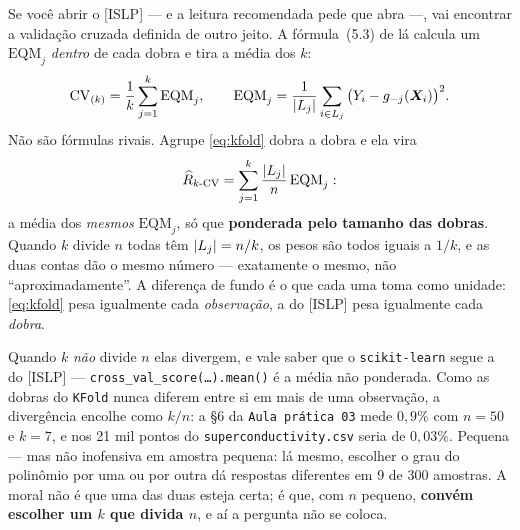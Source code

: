 \documentclass[11pt,a4paper]{article}
\begin{document}
\begin{atencao}
Se você abrir o [ISLP] --- e a leitura recomendada pede que abra ---, vai encontrar
a validação cruzada definida de outro jeito. A fórmula~(5.3) de lá calcula um
$\mathrm{EQM}_j$ \emph{dentro} de cada dobra e tira a média dos $k$:
\[
  \mathrm{CV}_{(k)} = \frac1k\sum_{j=1}^{k}\mathrm{EQM}_j,
  \qquad
  \mathrm{EQM}_j = \frac{1}{\left\lvert L_j \right\rvert}\sum_{i\in L_j}\big(Y_i-g_{-j}(\bm{X}_i)\big)^2 .
\]
Não são fórmulas rivais. Agrupe \eqref{eq:kfold} dobra a dobra e ela vira
\[
  \widehat{R}_{k\text{-CV}} = \sum_{j=1}^{k}\frac{\left\lvert L_j \right\rvert}{n}\,\mathrm{EQM}_j :
\]
a média dos \emph{mesmos} $\mathrm{EQM}_j$, só que \textbf{ponderada pelo tamanho
das dobras}. Quando $k$ divide $n$ todas têm $\left\lvert L_j \right\rvert=n/k$, os pesos são todos
iguais a $1/k$, e as duas contas dão o mesmo número --- exatamente o mesmo, não
``aproximadamente''. A diferença de fundo é o que cada uma toma como unidade:
\eqref{eq:kfold} pesa igualmente cada \emph{observação}, a do [ISLP] pesa
igualmente cada \emph{dobra}.

Quando $k$ \emph{não} divide $n$ elas divergem, e vale saber que o
\texttt{scikit-learn} segue a do [ISLP] --- \texttt{cross\_val\_score(\dots).mean()}
é a média não ponderada. Como as dobras do \texttt{KFold} nunca diferem entre si em
mais de uma observação, a divergência encolhe como $k/n$: a §6 da
\texttt{Aula prática 03} mede $0{,}9\%$ com $n=50$ e $k=7$, e nos 21 mil pontos do
\texttt{superconductivity.csv} seria de $0{,}03\%$. Pequena --- mas não inofensiva
em amostra pequena: lá mesmo, escolher o grau do polinômio por uma ou por outra dá
respostas diferentes em 9 de 300 amostras. A moral não é que uma das duas esteja
certa; é que, com $n$ pequeno, \textbf{convém escolher um $k$ que divida $n$}, e aí
a pergunta não se coloca.
\end{atencao}
\end{document}
